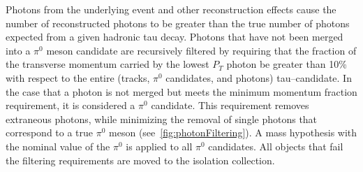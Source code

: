 Photons from the underlying event and other reconstruction effects cause the
number of reconstructed photons to be greater than the true number of photons
expected from a given hadronic tau decay.  Photons that have not been merged into
a $\pi^0$ meson candidate are recursively filtered by requiring that the
fraction of the transverse momentum carried by the lowest $P_T$ photon be
greater than 10\% with respect to the entire (tracks, $\pi^0$ candidates, and
photons) tau--candidate. In the case that a photon is not merged but meets the
minimum momentum fraction requirement, it is considered a $\pi^0$
candidate.  This requirement removes extraneous photons, while minimizing the
removal of single photons that correspond to a true $\pi^0$ meson
(see~\ref{fig:photonFiltering}). A mass hypothesis with the
nominal\cite{pdg} value of the $\pi^0$ is applied to all $\pi^0$ candidates.
All objects that fail the filtering requirements are moved to the isolation
collection.

